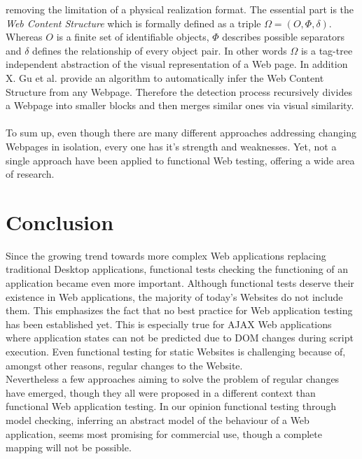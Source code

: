 \documentclass[12pt, notitlepage]{article}
\begin{document}
removing the limitation of a physical realization format. The essential part is the \textit{Web Content Structure} which is
formally defined as a triple $\Omega=(O,\Phi, \delta)$. Whereas $O$ is a finite set of identifiable objects, $\Phi$ describes
possible separators and $\delta$ defines the relationship of every object pair. In other words $\Omega$ is a tag-tree independent 
abstraction of the visual representation of a Web page. In addition X. Gu et al.\cite{understanding-web-adaption} provide
an algorithm to automatically infer the Web Content Structure from any Webpage. Therefore the detection process recursively 
divides a Webpage into smaller blocks and then merges similar ones via visual similarity. \\\\
To sum up, even though there are many different approaches addressing changing Webpages in isolation, every one has it's strength
and weaknesses. Yet, not a single approach have been applied to functional Web testing, offering a wide area of research.

\section*{Conclusion}
Since the growing trend towards more complex Web applications replacing traditional Desktop applications, functional tests checking
the functioning of an application became even more important. Although functional tests deserve their existence in Web applications, 
the majority of today’s Websites do not include them. This emphasizes the fact that no best practice for Web application
testing has been established yet. This is especially true for AJAX Web applications where application states can not be predicted due
to DOM changes during script execution. Even functional testing for static Websites is challenging because of, amongst other reasons, 
regular changes to the Website.\\ 
Nevertheless a few approaches aiming to solve the problem of regular changes have emerged, though they all were
proposed in a different context than functional Web application testing. In our opinion functional testing through model checking,
inferring an abstract model of the behaviour of a Web application, seems most promising for commercial use, though a complete
mapping will not be possible. 


\newpage
{}


\end{document}
